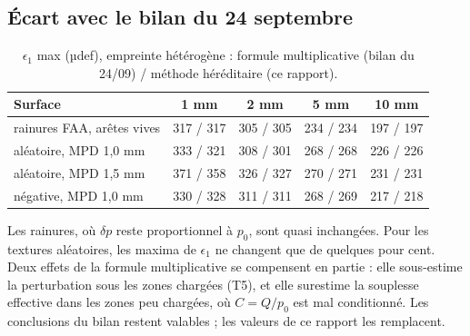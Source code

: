 \subsection{Écart avec le bilan du 24 septembre}
\begin{table}[H]\centering\footnotesize
\caption{$\epsilon_1$ max (µdef), empreinte hétérogène : formule multiplicative (bilan du 24/09) / méthode héréditaire (ce rapport).}
\begin{tabular}{lcccc}
\toprule
Surface & 1 mm & 2 mm & 5 mm & 10 mm\\
\midrule
rainures FAA, arêtes vives & 317 / 317 & 305 / 305 & 234 / 234 & 197 / 197\\
aléatoire, MPD 1,0 mm & 333 / 321 & 308 / 301 & 268 / 268 & 226 / 226\\
aléatoire, MPD 1,5 mm & 371 / 358 & 326 / 327 & 270 / 271 & 231 / 231\\
négative, MPD 1,0 mm & 330 / 328 & 311 / 311 & 268 / 269 & 217 / 218\\
\bottomrule
\end{tabular}
\end{table}
Les rainures, où $\delta p$ reste proportionnel à $p_0$, sont quasi inchangées. Pour les
textures aléatoires, les maxima de $\epsilon_1$ ne changent que de quelques pour cent. Deux
effets de la formule multiplicative se compensent en partie : elle sous-estime la perturbation
sous les zones chargées (T5), et elle surestime la souplesse effective dans les zones peu
chargées, où $C=Q/p_0$ est mal conditionné. Les conclusions du bilan restent valables ; les
valeurs de ce rapport les remplacent.